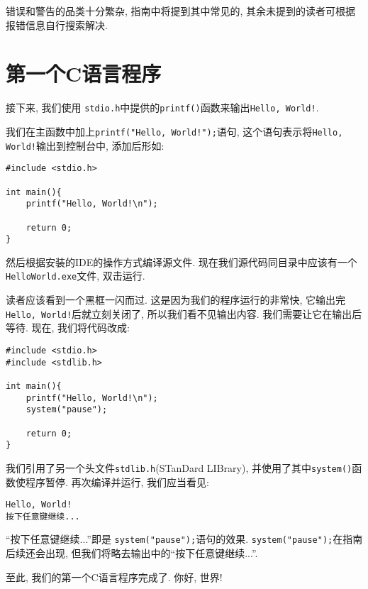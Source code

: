        错误和警告的品类十分繁杂, 指南中将提到其中常见的, 其余未提到的读者可根据报错信息自行搜索解决.

    \section{第一个C语言程序} \label{第一个C语言程序}
        接下来, 我们使用 \texttt{stdio.h}中提供的\texttt{printf()}函数来输出\texttt{Hello, World!}.

        我们在主函数中加上\texttt{printf("Hello, World!");}语句, 这个语句表示将\texttt{Hello, World!}输出到控制台中, 添加后形如:
\begin{lstlisting}
#include <stdio.h>

int main(){
    printf("Hello, World!\n");

    return 0;
}
\end{lstlisting}

        然后根据安装的IDE的操作方式编译源文件. 现在我们源代码同目录中应该有一个\texttt{HelloWorld.exe}文件, 双击运行.

        读者应该看到一个黑框一闪而过. 这是因为我们的程序运行的非常快, 它输出完\texttt{Hello, World!}后就立刻关闭了, 所以我们看不见输出内容. 我们需要让它在输出后等待. 现在, 我们将代码改成:
\begin{lstlisting}
#include <stdio.h>
#include <stdlib.h>

int main(){
    printf("Hello, World!\n");
    system("pause");

    return 0;
}
\end{lstlisting}

        我们引用了另一个头文件\texttt{stdlib.h}(STanDard LIBrary), 并使用了其中\texttt{system()}函数使程序暂停. 再次编译并运行, 我们应当看见:
\begin{lstlisting}
Hello, World!
按下任意键继续...
\end{lstlisting}

        ``按下任意键继续...''即是 \texttt{system("pause");}语句的效果. \texttt{system("pause");}在指南后续还会出现, 但我们将略去输出中的``按下任意键继续...''. 
        
        至此, 我们的第一个C语言程序完成了. 你好, 世界!

    \sumrule
